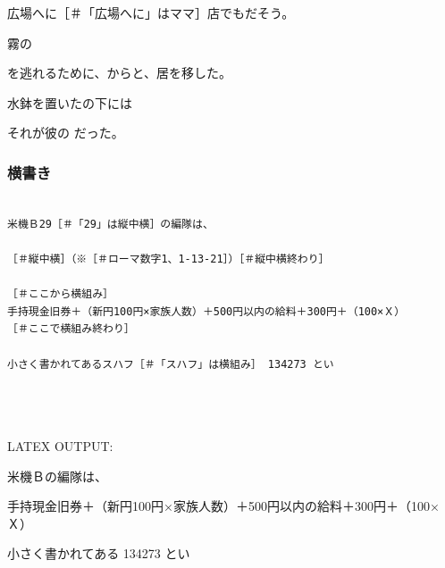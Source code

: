 \documentclass[a4paper,tate]{jlreq}
\begin{document}
広場へに{\small ［＃「広場へに」はママ］}店でもだそう。


霧の


を逃れるために、からと、居を移した。


水鉢を置いたの下には


それが彼の  だった。






















\newpage
\subsubsection*{横書き}
\footnotesize
\linespread{1.0}
\begin{verbatim}

米機Ｂ29［＃「29」は縦中横］の編隊は、

［＃縦中横］（※［＃ローマ数字1、1-13-21］）［＃縦中横終わり］

［＃ここから横組み］
手持現金旧券＋（新円100円×家族人数）＋500円以内の給料＋300円＋（100×Ｘ）
［＃ここで横組み終わり］

小さく書かれてあるスハフ［＃「スハフ」は横組み］ 134273 とい




\end{verbatim}
\linespread{1.4}
\normalsize
LATEX OUTPUT:
\zw


米機Ｂの編隊は、




\parbox{\textwidth}{\utod
手持現金旧券＋（新円100円×家族人数）＋500円以内の給料＋300円＋（100×Ｘ）
}
小さく書かれてある 134273 とい
\end{document}
